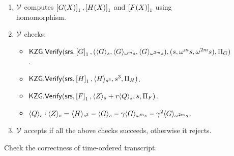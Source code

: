\begin{figure}[htbp]
\begin{mdframed}
{\begin{enumerate}[leftmargin=1em, label=\arabic*.]
\begin{itemize}[leftmargin=1em]
            \end{itemize}
            \item $\verifier$ computes $\gone{G(X)},\gone{H(X)}$ and $\gone{F(X)}$ using homomorphism.
            \item $\verifier$ checks:
            \begin{itemize}[leftmargin=1em]
                \item $\kzgverify(\srs,\gone{G}, (\val{s}{G}, \val{\omega^m s}{G}, \val{\omega^{2m} s}{G}),\\(s,\omega^m s, \omega^{2m}s),\Pi_G)$.
                \item $\kzgverify(\srs,\gone{H}, \val{s^3}{H}, s^3, \Pi_H)$.
                \item $\kzgverify(\srs,\gone{F}, \val{s}{Z} + r\val{s}{Q}, s, \Pi_F)$.
                \item $\val{s}{Q}\cdot \val{s}{Z} = \val{s^3}{H}-\val{s}{G}-\gamma \val{\omega^m s}{G}-\gamma^2\val{\omega^{2m}s}{G}$.
            \end{itemize}
            \item $\verifier$ accepts if all the above checks succeeds, otherwise it rejects.
        \end{enumerate}
    }
    \end{mdframed}
    \caption{Check the correctness of time-ordered transcript.}
    \label{fig:time-ordered-transcript}
\end{figure}

